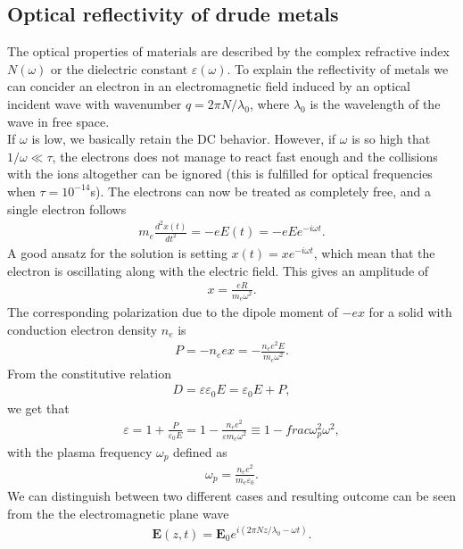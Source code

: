 \subsection{Optical reflectivity of drude metals}
The optical properties of materials are described by the complex refractive index $N(\omega)$ or 
the dielectric constant $\varepsilon(\omega)$. 
To explain the reflectivity of metals we can concider an electron in an electromagnetic 
field induced by an optical incident wave with wavenumber $q = 2\pi N/\lambda_0$, where 
$\lambda_0$ is the wavelength of the wave in free space.\\
If $\omega$ is low, we basically retain the DC behavior. However, if $\omega$ is so high that 
$1/\omega \ll \tau$, the electrons does not manage to react fast enough and the collisions with 
the ions altogether can be ignored (this is fulfilled for optical frequencies when $\tau=10^{-14}$s). 
The electrons can now be treated as completely free, and a single electron follows
\begin{align}
   m_e \frac{d^2x(t)}{dt^2} = -e E(t) = -e E e^{-i \omega t}.
   \label{freeElectronGas}
\end{align}
A good ansatz for the solution is setting $x(t) = xe^{-i \omega t}$, which mean that 
the electron is oscillating along with the electric field. This gives an amplitude of
\begin{align}
   x = \frac{eR}{m_e \omega^2}.
\end{align}
The corresponding polarization due to the dipole moment of $-ex$ for a solid with conduction electron
density $n_e$ is
\begin{align}
   P = -n_e ex = -\frac{n_e e^2E}{m_e \omega^2}.
\end{align}
From the constitutive relation
\begin{align}
   D = \varepsilon \varepsilon_0 E = \varepsilon_0 E + P,
\end{align}
we get that 
\begin{align}
   \varepsilon = 1 + \frac{P}{\varepsilon_0 E} = 1 - \frac{n_e e^2}{\varepsilon m_e \omega^2}
   \equiv 1 - frac{\omega_p^2}{\omega^2},
\end{align}
with the plasma frequency $\omega_p$ defined as
\begin{align}
   \omega_p = \frac{n_e e^2}{m_e\varepsilon_0}.
\end{align}
We can distinguish between two different cases and resulting outcome can
be seen from the the electromagnetic plane wave
\begin{align}
   \boldsymbol E (z,t) = \boldsymbol E_0 e^{i(2\pi N z/ \lambda_0 - \omega t)}.
\end{align}
